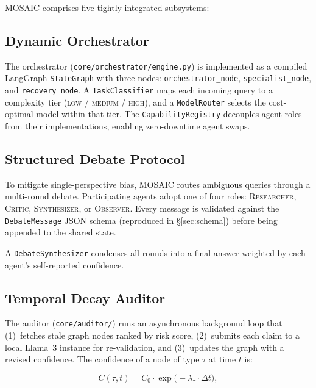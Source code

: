 \documentclass{article}
\begin{document}
MOSAIC comprises five tightly integrated subsystems:

\subsection{Dynamic Orchestrator}
\label{sec:orchestrator}

The orchestrator (\texttt{core/orchestrator/engine.py}) is implemented as a
compiled LangGraph \texttt{StateGraph} with three nodes:
\texttt{orchestrator\_node}, \texttt{specialist\_node}, and
\texttt{recovery\_node}.  A \texttt{TaskClassifier} maps each incoming query to
a complexity tier (\textsc{low} / \textsc{medium} / \textsc{high}), and a
\texttt{ModelRouter} selects the cost-optimal model within that tier.  The
\texttt{CapabilityRegistry} decouples agent roles from their implementations,
enabling zero-downtime agent swaps.

\subsection{Structured Debate Protocol}
\label{sec:debate}

To mitigate single-perspective bias, MOSAIC routes ambiguous queries through
a multi-round debate.  Participating agents adopt one of four roles:
\textsc{Researcher}, \textsc{Critic}, \textsc{Synthesizer}, or
\textsc{Observer}.  Every message is validated against the \texttt{DebateMessage}
JSON schema (reproduced in \S\ref{sec:schema}) before being appended to the
shared state.

A \texttt{DebateSynthesizer} condenses all rounds into a final answer weighted
by each agent's self-reported confidence.

\subsection{Temporal Decay Auditor}
\label{sec:auditor}

The auditor (\texttt{core/auditor/}) runs an asynchronous background loop that
(1)~fetches stale graph nodes ranked by risk score, (2)~submits each claim to a
local Llama~3 instance for re-validation, and (3)~updates the graph with a
revised confidence.  The confidence of a node of type $\tau$ at time $t$ is:

\begin{equation}
  C(\tau, t) = C_0 \cdot \exp\!\bigl(-\lambda_\tau \cdot \Delta t\bigr),
  \label{eq:decay}
\end{equation}
\end{document}
